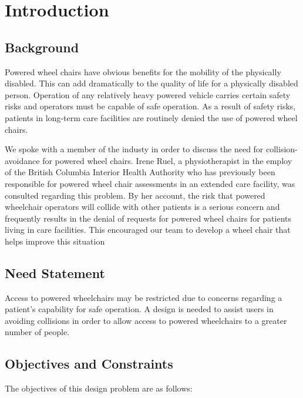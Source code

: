 \documentclass[oneside,final,a4paper]{report}
\begin{document}
\clearpage
\setcounter{page}{1}
\pagestyle{headings}

\chapter{Introduction}
\section{Background}
Powered wheel chairs have obvious benefits for the mobility of the physically disabled. This can add dramatically to the quality of life for a physically disabled person. Operation of any relatively heavy powered vehicle carries certain safety risks and operators must be capable of safe operation. As a result of safety risks, patients in long-term care facilities are routinely denied the use of powered wheel chairs. 

We spoke with a member of the industy in order to discuss the need for collision-avoidance for powered wheel chairs. Irene Ruel, a physiotherapist in the employ of the British Columbia Interior Health Authority who has previously been responsible for powered wheel chair assessments in an extended care facility, was consulted regarding this problem. By her account, the risk that powered wheelchair operators will collide with other patients is a serious concern and frequently results in the denial of requests for powered wheel chairs for patients living in care facilities. This encouraged our team to develop a wheel chair that helps improve this situation

\section{Need Statement}
Access to powered wheelchairs may be restricted due to concerns regarding a patient's capability for safe operation. A design is needed to assist users in avoiding collisions in order to allow access to powered wheelchairs to a greater number of people.

\section{Objectives and Constraints}
The objectives of this design problem are as follows:
\end{document}
